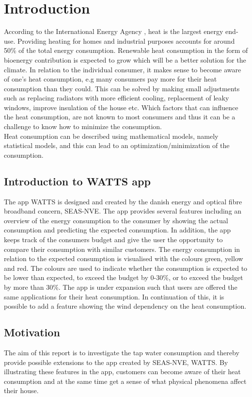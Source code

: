 \chapter{Introduction}
\noindent According to the International Energy Agency \cite{iea}, heat is the largest energy end-use. Providing heating for homes and industrial purposes accounts for around 50\% of the total energy consumption. Renewable heat consumption in the form of bioenergy contribution is expected to grow which will be a better solution for the climate. In relation to the individual consumer, it makes sense to become aware of one's heat consumption, e.g many consumers pay more for their heat consumption than they could. This can be solved by making small adjustments such as replacing radiators with more efficient cooling, replacement of leaky windows, improve insulation of the house etc. Which factors that can influence the heat consumption, are not known to most consumers and thus it can be a challenge to know how to minimize the consumption. \\

\noindent Heat consumption can be described using mathematical models, namely statistical models, and this can lead to an optimization/minimization of the consumption.

\section{Introduction to WATTS app}
The app WATTS is designed and created by the danish energy and optical fibre broadband concern, SEAS-NVE. The app provides several features including an overview of the energy consumption to the consumer by showing the actual consumption and predicting the expected consumption. In addition, the app keeps track of the consumers budget and give the user the opportunity to compare their consumption with similar customers. The energy consumption in relation to the expected consumption is visualised with the colours green, yellow and red. The colours are used to indicate whether the consumption is expected to be lower than expected, to exceed the budget by 0-30\%, or to exceed the budget by more than 30\%.
\noindent The app is under expansion such that users are offered the same applications for their heat consumption. In continuation of this, it is possible to add a feature showing the wind dependency on the heat consumption.

\section{Motivation}
The aim of this report is to investigate the tap water consumption and thereby provide possible extensions to the app created by SEAS-NVE, WATTS. By illustrating these features in the app, customers can become aware of their heat consumption and at the same time get a sense of what physical phenomena affect their house. \\

